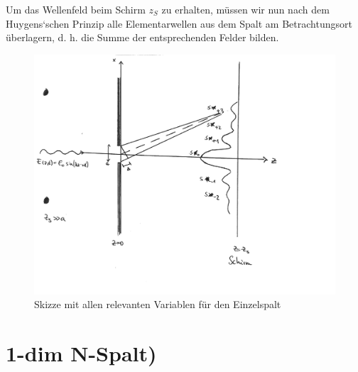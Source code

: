 \documentclass[a4paper]{article}
\begin{document}
Um das Wellenfeld beim Schirm $z_S$ zu erhalten, müssen wir nun
nach dem Huygens‘schen Prinzip alle Elementarwellen aus dem Spalt am Betrachtungsort
überlagern, d. h. die Summe der entsprechenden Felder bilden.
\begin{figure}[!htb]
\centering
\includegraphics[scale=0.8]{einzelspalt.pdf}
\caption{Skizze mit allen relevanten Variablen für den Einzelspalt}
\end{figure}

\section{1-dim N-Spalt)}
\end{document}
